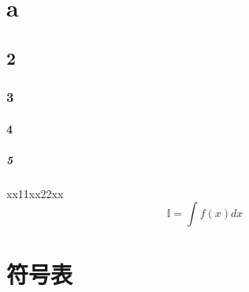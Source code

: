 \documentclass[oneside,10pt]{article}
\begin{document}
\section{a}
\subsection{2}
\subsubsection{3}
\paragraph{4}
\subparagraph{5}
xx11xx22xx\cite{cal_pde,kingma2014adam,guo_convolutional_2016}
\begin{equation}
  \mathbb{I} = \int f(x)dx
\end{equation}











\newpage
%








\newpage
\appendix
{}
\section{符号表}
\end{document}

